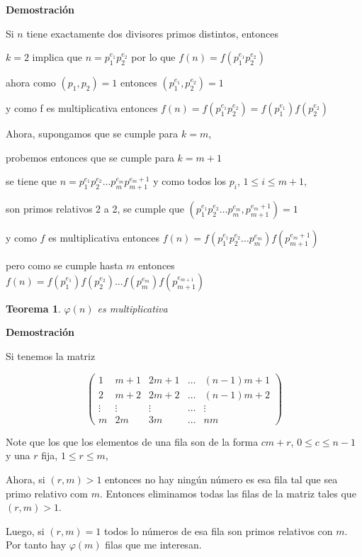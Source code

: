 \documentclass[a4paper,12pt]{report}
\newtheorem*{teo}{Teorema}
\begin{document}
\textbf{Demostración}

Si $n$ tiene exactamente dos divisores primos distintos, entonces

$k=2$ implica que $n=p_1^{e_1}p_2^{e_2}$ por lo que $f(n)=f(p_1^{e_1}p_2^{e_2})$

ahora como $(p_1,p_2)=1$ entonces $(p_1^{e_1},p_2^{e_2})=1$

y como f es multiplicativa entonces $f(n)=f(p_1^{e_1}p_2^{e_2})=f(p_1^{e_1})f(p_2^{e_2})$


Ahora, supongamos que se cumple para $k=m$,

probemos entonces que se cumple para $k=m+1$

se tiene que $n=p_1^{e_1}p_2^{e_2}\dots p_{m}^{e_m}p_{m+1}^{e_m+1}$ y como todos los $p_i$, $1\leq i \leq m+1$,

son primos relativos 2 a 2, se cumple que $(p_1^{e_1}p_2^{e_2}\dots p_{m}^{e_m},p_{m+1}^{e_m+1})=1$

y como $f$ es multiplicativa entonces $f(n)=f(p_1^{e_1}p_2^{e_2}\dots p_{m}^{e_m})f(p_{m+1}^{e_m+1})$

pero como se cumple hasta $m$ entonces $f(n)=f(p_1^{e_1})f(p_2^{e_2})\dots f(p_m^{e_m})f(p_{m+1}^{e_{m+1}})$

\begin{teo}
 $\varphi(n)$ es multiplicativa
\end{teo}


\textbf{Demostración}

Si tenemos la matriz

\begin{equation}
\begin{pmatrix}
1 & m+1 & 2m+1& \dots & (n-1)m+1\\
2 & m+2 & 2m+2& \dots & (n-1)m+2\\
\vdots & \vdots & \vdots& \dots & \vdots\\
m & 2m & 3m& \dots & nm
\end{pmatrix}
\end{equation}

Note que los que los elementos de una fila son de la forma $cm + r$,  $0 \leq c \leq n-1$ y una $r$ fija, $1\leq r \leq m$,

Ahora, si $(r,m)>1$ entonces no hay ningún número es esa fila tal que sea primo relativo com $m$. Entonces eliminamos todas las filas de la matriz tales que $(r,m)>1$.

Luego, si $(r,m)=1$ todos lo números de esa fila son primos relativos con $m$. Por tanto hay $\varphi(m)$ filas que me interesan.
\end{document}
